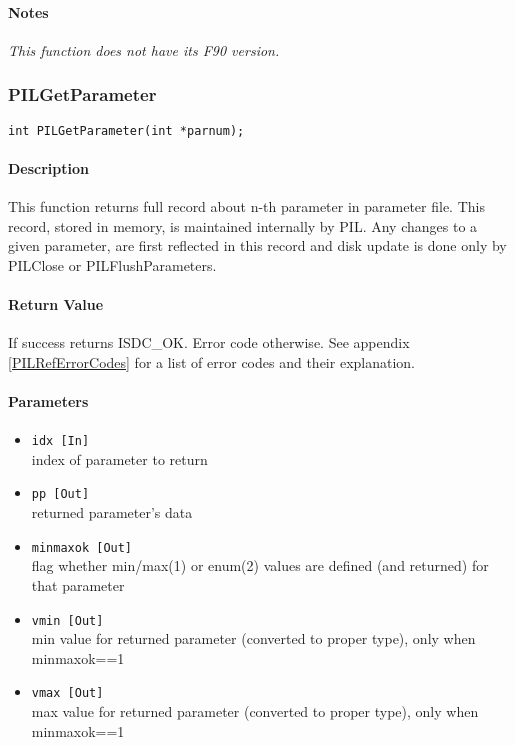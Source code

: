 \paragraph{Notes\\}
{\it
This function does not have its F90 version.
}



\subsubsection{PILGetParameter}

\begin{verbatim}
int PILGetParameter(int *parnum); 
\end{verbatim}

\paragraph{Description\\}
This function returns full record about n-th parameter in parameter file.
This record, stored in memory, is maintained internally by PIL. Any changes
to a given parameter, are first reflected in this record and disk update
is done only by PILClose or PILFlushParameters.

\paragraph{Return Value\\}
If success returns ISDC\_OK. Error code otherwise. See appendix \ref{PILRefErrorCodes}
for a list of error codes and their explanation.

\paragraph{Parameters}
\begin{itemize}
\item
{\tt idx [In] } \\
index of parameter to return
\item
{\tt pp [Out] } \\
returned parameter's data
\item
{\tt minmaxok [Out] } \\
flag whether min/max(1) or enum(2) values are defined (and returned) for that parameter
\item
{\tt vmin [Out] } \\
min value for returned parameter (converted to proper type), only when minmaxok==1
\item
{\tt vmax [Out] } \\
max value for returned parameter (converted to proper type), only when minmaxok==1
\end{itemize}

